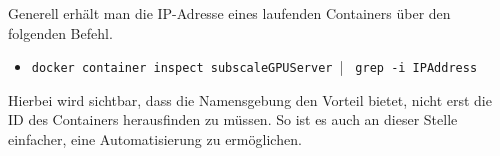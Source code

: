 Generell erhält man die IP-Adresse eines laufenden Containers über den folgenden Befehl.
\begin{itemize}
    \item[] \verb|docker container inspect subscaleGPUServer || \verb| grep -i IPAddress|
\end{itemize}
Hierbei wird sichtbar, dass die Namensgebung den Vorteil bietet, nicht erst die ID des Containers herausfinden zu
müssen. So ist es auch an dieser Stelle einfacher, eine Automatisierung zu ermöglichen.
